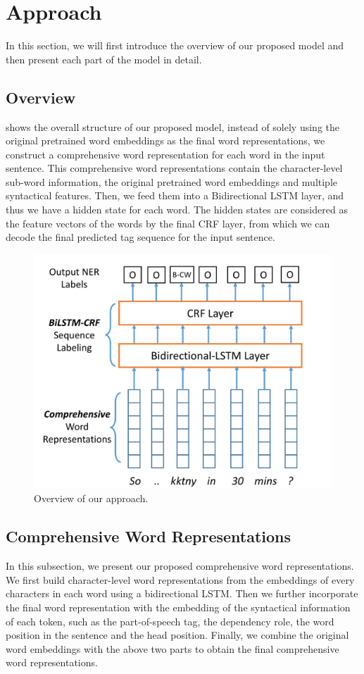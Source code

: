 \section{Approach}
\label{sec:approach}
In this section, we will first introduce the overview of our proposed model and then present each part of the model in detail.
 
\subsection{Overview}
 shows the overall structure of our proposed model, 
instead of solely using the original pretrained word embeddings as the final word representations, 
we construct a comprehensive word representation for each word in the input sentence.
This comprehensive word representations contain the character-level sub-word information, the original pretrained word embeddings and multiple syntactical features. 
Then, we feed them into a Bidirectional LSTM layer, and thus we have a hidden state for each word. 
The hidden states are considered as the feature vectors of the words by the final CRF layer, from which we can decode the final predicted tag sequence for the input sentence.
\begin{figure}[th!]
	\includegraphics[width=\columnwidth]{figures/overview}
	\caption{Overview of our approach.}
	\label{fig:overall}
\end{figure}
 
\subsection{Comprehensive Word Representations}
In this subsection, we present our proposed comprehensive word representations. 
We first build character-level word representations from the embeddings of every characters in each word using a bidirectional LSTM. 
Then we further incorporate the final word representation with the embedding of the syntactical information of each token, such as the part-of-speech tag, the dependency role, the word position in the sentence and the head position. 
Finally, we combine the original word embeddings with the above two parts to obtain the final comprehensive word representations.

